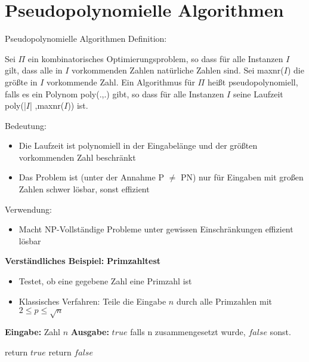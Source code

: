 \section{Pseudopolynomielle Algorithmen}

\begin{frame}{Pseudopolynomielle Algorithmen}
Definition:

Sei $\Pi$ ein kombinatorisches Optimierungsproblem, so dass für alle Instanzen $I$ gilt, dass alle in $I$ vorkommenden Zahlen natürliche Zahlen sind. Sei maxnr($I$) die größte in $I$ vorkommende Zahl. Ein Algorithmus für $\Pi$ heißt pseudopolynomiell, falls es ein Polynom poly(.,.)  gibt, so 
dass für alle Instanzen $I$ seine Laufzeit poly(|$I$| ,maxnr($I$)) ist. 

\end{frame}
\begin{frame}
Bedeutung:

\begin{itemize}
\item
Die Laufzeit ist polynomiell in der Eingabelänge und der größten vorkommenden Zahl beschränkt

\item
Das Problem ist (unter der Annahme P $\neq$ PN) nur für Eingaben mit großen Zahlen schwer lösbar, sonst effizient

\end{itemize}

Verwendung:
\begin{itemize}
\item
Macht NP-Vollständige Probleme unter gewissen Einschränkungen effizient lösbar

\end{itemize}
\end{frame}

\begin{frame}
\textbf{Verständliches Beispiel:}
\textbf{Primzahltest}

\begin{itemize}
\item
Testet, ob eine gegebene Zahl eine Primzahl ist
\item
Klassisches Verfahren: Teile die Eingabe $n$ durch alle Primzahlen mit $2 \leq p \leq \sqrt{n}$
\end{itemize}

\textbf{Eingabe:} Zahl $n$ \newline
\textbf{Ausgabe:} $true$ falls n zusammengesetzt wurde, $false$ sonst.\newline

\begin{algorithmic}

	\State return $true$
\Else
	\State return $false$
\EndIf
\EndFor
\end{algorithmic}
\end{frame}

